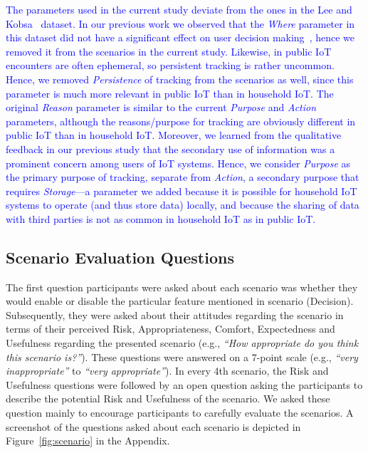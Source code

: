 \textcolor{blue}{The parameters used in the current study deviate from the ones in the Lee and Kobsa~\cite{lee2016understanding} dataset. In our previous work we observed that the \emph{Where} parameter in this dataset did not have a significant effect on user decision making~\cite{bahiratiui2018}, hence we removed it from the scenarios in the current study. Likewise, in public IoT encounters are often ephemeral, so persistent tracking is rather uncommon. Hence, we removed \emph{Persistence} of tracking from the scenarios as well, since this parameter is much more relevant in public IoT than in household IoT. The original \emph{Reason} parameter is similar to the current \emph{Purpose} and \emph{Action}  parameters, although the reasons/purpose for tracking are obviously different in public IoT than in household IoT.}
\textcolor{blue}{Moreover, we learned from the qualitative feedback in our previous study that the secondary use of information was a prominent concern among users of IoT systems. Hence, we consider \emph{Purpose} as the primary purpose of tracking, separate from \emph{Action}, a secondary purpose that requires \emph{Storage}---a parameter we added because it is possible for household IoT systems to operate (and thus store data) locally, and because the sharing of data with third parties is not as common in household IoT as in public IoT.}

\subsection{Scenario Evaluation Questions}
\label{sec:questions}
The first question participants were asked about each scenario was whether they would enable or disable the particular feature mentioned in scenario (Decision). Subsequently, they were asked about their attitudes regarding the scenario in terms of their perceived Risk, Appropriateness, Comfort, Expectedness and Usefulness regarding the presented scenario (e.g., \emph{``How appropriate do you think this scenario is?''}). These questions were answered on a 7-point scale (e.g., \emph{``very inappropriate''} to \emph{``very appropriate''}). In every 4th scenario, the Risk and Usefulness questions were followed by an open question asking the participants to describe the potential Risk and Usefulness of the scenario. We asked these question mainly to encourage participants to carefully evaluate the scenarios. A screenshot of the questions asked about each scenario is depicted in Figure~\ref{fig:scenario} in the Appendix.

